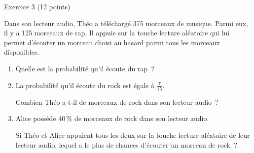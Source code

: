 
\begin{h2}Exercice 3 (12 points)\end{h2}
\medbreak
Dans son lecteur audio, Théo a téléchargé 375 morceaux de musique. Parmi eux, il y a 125 morceaux de rap. Il appuie sur la touche \og lecture aléatoire\fg{} qui lui permet d'écouter un morceau choisi au hasard parmi tous les morceaux disponibles.
\medbreak
\begin{enumerate}
     \item Quelle est la probabilité qu'il écoute du rap~?
     \item La probabilité qu'il écoute du rock est égale à $\frac{7}{15}$.
     \par
     Combien Théo a-t-il de morceaux de rock dans son lecteur audio~?
     \item  Alice possède 40\,\% de morceaux de rock dans son lecteur audio.
     \par
     Si Théo et Alice appuient tous les deux sur la touche \og lecture aléatoire\fg{} de leur lecteur audio, lequel a le plus de chances d'écouter un morceau de rock~?
\end{enumerate}

